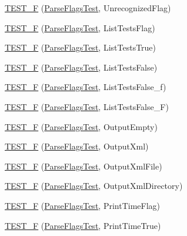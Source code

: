 \begin{DoxyCompactItemize}
\mbox{\hyperlink{namespacetesting_a876c9749edf7e23132e0b47ad8cfe02c}{T\+E\+S\+T\+\_\+F}} (\mbox{\hyperlink{classtesting_1_1_parse_flags_test}{Parse\+Flags\+Test}}, Unrecognized\+Flag)
\item 
\mbox{\hyperlink{namespacetesting_a3fb86cb10e61ed9007bd22c5ba3b2c62}{T\+E\+S\+T\+\_\+F}} (\mbox{\hyperlink{classtesting_1_1_parse_flags_test}{Parse\+Flags\+Test}}, List\+Tests\+Flag)
\item 
\mbox{\hyperlink{namespacetesting_a5ce87a07245c10d86d465cb8db493065}{T\+E\+S\+T\+\_\+F}} (\mbox{\hyperlink{classtesting_1_1_parse_flags_test}{Parse\+Flags\+Test}}, List\+Tests\+True)
\item 
\mbox{\hyperlink{namespacetesting_a983e3df92745027bf68413ecc09f4198}{T\+E\+S\+T\+\_\+F}} (\mbox{\hyperlink{classtesting_1_1_parse_flags_test}{Parse\+Flags\+Test}}, List\+Tests\+False)
\item 
\mbox{\hyperlink{namespacetesting_a381c90024f28d66ed25e687a94c8b329}{T\+E\+S\+T\+\_\+F}} (\mbox{\hyperlink{classtesting_1_1_parse_flags_test}{Parse\+Flags\+Test}}, List\+Tests\+False\+\_\+f)
\item 
\mbox{\hyperlink{namespacetesting_a05a7a818dedb4fdf5b0aac632d97e2dc}{T\+E\+S\+T\+\_\+F}} (\mbox{\hyperlink{classtesting_1_1_parse_flags_test}{Parse\+Flags\+Test}}, List\+Tests\+False\+\_\+F)
\item 
\mbox{\hyperlink{namespacetesting_a27d34eacec5189fae8349b4a96aea619}{T\+E\+S\+T\+\_\+F}} (\mbox{\hyperlink{classtesting_1_1_parse_flags_test}{Parse\+Flags\+Test}}, Output\+Empty)
\item 
\mbox{\hyperlink{namespacetesting_addbcb86017a124d8e6afbc6933b7c251}{T\+E\+S\+T\+\_\+F}} (\mbox{\hyperlink{classtesting_1_1_parse_flags_test}{Parse\+Flags\+Test}}, Output\+Xml)
\item 
\mbox{\hyperlink{namespacetesting_aba922f243ca36645e7001596dc61ad9b}{T\+E\+S\+T\+\_\+F}} (\mbox{\hyperlink{classtesting_1_1_parse_flags_test}{Parse\+Flags\+Test}}, Output\+Xml\+File)
\item 
\mbox{\hyperlink{namespacetesting_aa3fd714488b3f3caa6af5394a63d38f4}{T\+E\+S\+T\+\_\+F}} (\mbox{\hyperlink{classtesting_1_1_parse_flags_test}{Parse\+Flags\+Test}}, Output\+Xml\+Directory)
\item 
\mbox{\hyperlink{namespacetesting_a9442229ba2091a4f892a36519f458be8}{T\+E\+S\+T\+\_\+F}} (\mbox{\hyperlink{classtesting_1_1_parse_flags_test}{Parse\+Flags\+Test}}, Print\+Time\+Flag)
\item 
\mbox{\hyperlink{namespacetesting_ae26478ca77d32fa5a519294b23a423f2}{T\+E\+S\+T\+\_\+F}} (\mbox{\hyperlink{classtesting_1_1_parse_flags_test}{Parse\+Flags\+Test}}, Print\+Time\+True)

\end{DoxyCompactItemize}
